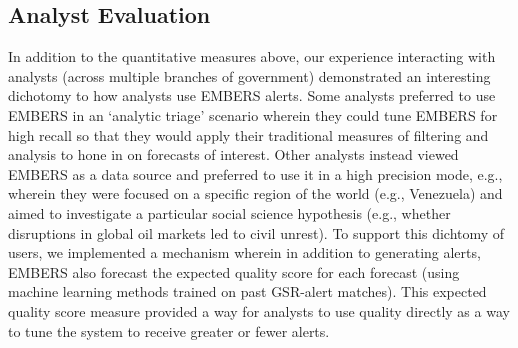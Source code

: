 
\subsection{Analyst Evaluation}
In addition to the quantitative measures above, our experience interacting with analysts (across multiple
branches of government) demonstrated
an interesting dichotomy to how analysts use EMBERS alerts. Some analysts preferred to use EMBERS in an
`analytic triage' scenario wherein they could tune EMBERS for high recall so that they would apply their
traditional measures of filtering and analysis to hone in on forecasts of interest. Other analysts 
instead viewed EMBERS as a data source and preferred to use it in a high precision mode, e.g., wherein they
were focused on a specific region of the world (e.g., Venezuela) and aimed to investigate a particular
social science hypothesis (e.g., whether disruptions in global oil markets led to civil unrest). 
To support this dichtomy of users, we implemented a mechanism wherein in addition to generating alerts, EMBERS
also forecast the expected quality score for each forecast (using machine learning methods trained on
past GSR-alert matches). This expected quality score measure provided a way for analysts to use quality
directly as a way to tune the system to receive greater or fewer alerts.



